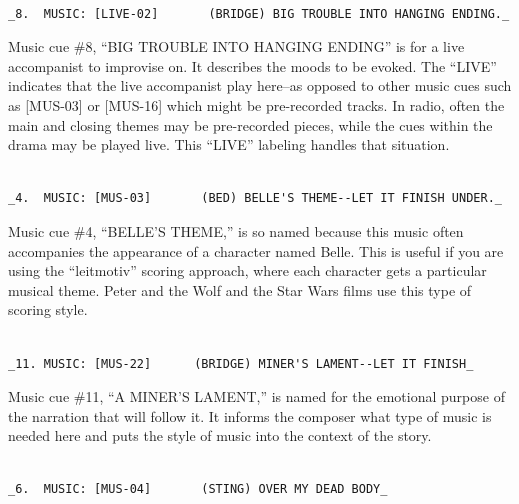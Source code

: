 \documentclass[openleft,oneside,showtrims]{memoir}
\begin{document}
\begin{itemize}
\begin{itemize}
\lstset{language=fountain,label= ,caption= ,captionpos=b,numbers=none}
\begin{lstlisting}

_8.  MUSIC: [LIVE-02]       (BRIDGE) BIG TROUBLE INTO HANGING ENDING._

\end{lstlisting}

Music cue \#8, ``BIG TROUBLE INTO HANGING ENDING'' is for a live accompanist to improvise on. It describes the moods to be evoked. The ``LIVE'' indicates that the live accompanist play here--as opposed to other music cues such as [MUS-03] or [MUS-16] which might be pre-recorded tracks. In radio, often the main and closing themes may be pre-recorded pieces, while the cues within the drama may be played live. This ``LIVE'' labeling handles that situation.

\lstset{language=fountain,label= ,caption= ,captionpos=b,numbers=none}
\begin{lstlisting}

_4.  MUSIC: [MUS-03]       (BED) BELLE'S THEME--LET IT FINISH UNDER._

\end{lstlisting}

Music cue \#4, ``BELLE'S THEME,'' is so named because this music often accompanies the appearance of a character named Belle. This is useful if you are using the ``leitmotiv'' scoring approach, where each character gets a particular musical theme. Peter and the Wolf and the Star Wars films use this type of scoring style.

\lstset{language=fountain,label= ,caption= ,captionpos=b,numbers=none}
\begin{lstlisting}

_11. MUSIC: [MUS-22]      (BRIDGE) MINER'S LAMENT--LET IT FINISH_

\end{lstlisting}

Music cue \#11, ``A MINER'S LAMENT,'' is named for the emotional purpose of the narration that will follow it. It informs the composer what type of music is needed here and puts the style of music into the context of the story.

\lstset{language=fountain,label= ,caption= ,captionpos=b,numbers=none}
\begin{lstlisting}

_6.  MUSIC: [MUS-04]       (STING) OVER MY DEAD BODY_

\end{lstlisting}


\end{itemize}
\end{itemize}
\end{document}
